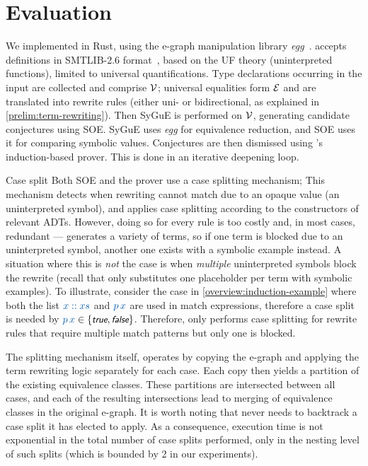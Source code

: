 \section{Evaluation}
\label{thesy:evaluation}

We implemented \TheSy in Rust, using the e-graph manipulation library \emph{egg}~\cite{egg}.
\TheSy accepts definitions in SMTLIB-2.6 format~\cite{TR2017:Barrett},
based on the UF theory (uninterpreted functions),
limited to universal quantifications.
Type declarations occurring in the input are collected and comprise $\mathcal{V}$;
universal equalities form $\mathcal{E}$ and are translated into rewrite rules (either uni- or bidirectional, as explained in \autoref{prelim:term-rewriting}).
Then SyGuE is performed on $\mathcal{V}$, generating candidate conjectures using SOE.
SyGuE uses \emph{egg} for equivalence reduction, and SOE uses it for comparing symbolic values. Conjectures are then dismissed using \TheSy's induction-based prover.
This is done in an iterative deepening loop.

\begin{paragraph}{Case split\quad}
Both SOE and the prover use a case splitting mechanism; This mechanism detects when rewriting cannot match due to an opaque value (an uninterpreted symbol), and applies case splitting according to the constructors of relevant ADTs.
However, doing so for every rule is too costly and, in most cases, redundant --- \TheSy generates a variety of terms, so if one term is blocked due to an uninterpreted symbol, another one exists with a symbolic example instead.
A situation where this is \emph{not} the case is when \emph{multiple} uninterpreted symbols block the rewrite (recall that \TheSy only substitutes one placeholder per term with symbolic examples). 
To illustrate, consider the case in \autoref{overview:induction-example} where both the list $\clrterm x::xs$ and $\clrterm p\,x$ are used in match expressions, therefore a case split is needed by ${\clrterm p\,x} \in \{\ttrue,\tfalse\}$.
Therefore, \TheSy only performs case splitting for rewrite rules that require multiple match patterns but only one is blocked.

The splitting mechanism itself, operates by copying the e-graph and applying the term rewriting logic separately for each case. 
Each copy then yields a partition of the existing equivalence classes. 
These partitions are intersected between all cases, and each of the resulting intersections lead to merging of equivalence classes in the original e-graph.
It is worth noting that \TheSy never needs to backtrack a case split it has elected to apply.
As a consequence, execution time is not exponential in the total number of case splits performed, only in the nesting level of such splits (which is bounded by 2 in our experiments). 
\end{paragraph}

